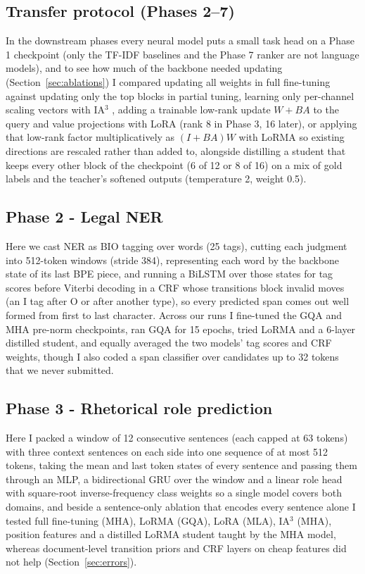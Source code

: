 \documentclass[11pt, oneside]{article}
\begin{document}
\subsection{Transfer protocol (Phases 2--7)}
In the downstream phases every neural model puts a small task head on a Phase 1 checkpoint (only the TF-IDF baselines and the Phase 7 ranker are not language models), and to see how much of the backbone needed updating (Section~\ref{sec:ablations}) I compared updating all weights in full fine-tuning against updating only the top blocks in partial tuning, learning only per-channel scaling vectors with IA$^3$ \cite{liu2022ia3}, adding a trainable low-rank update $W+BA$ to the query and value projections with LoRA \cite{hu2022lora} (rank 8 in Phase 3, 16 later), or applying that low-rank factor multiplicatively as $(I+BA)W$ with LoRMA \cite{bihany2025lorma} so existing directions are rescaled rather than added to, alongside distilling \cite{hinton2015distilling} a student that keeps every other block of the checkpoint (6 of 12 or 8 of 16) on a mix of gold labels and the teacher's softened outputs (temperature 2, weight 0.5).

\subsection{Phase 2 - Legal NER}
Here we cast NER as BIO tagging over words (25 tags), cutting each judgment into 512-token windows (stride 384), representing each word by the backbone state of its last BPE piece, and running a BiLSTM over those states for tag scores before Viterbi decoding in a CRF \cite{lafferty2001crf} whose transitions block invalid moves (an I tag after O or after another type), so every predicted span comes out well formed from first to last character. Across our runs I fine-tuned the GQA and MHA pre-norm checkpoints, ran GQA for 15 epochs, tried LoRMA and a 6-layer distilled student, and equally averaged the two models' tag scores and CRF weights, though I also coded a span classifier over candidates up to 32 tokens that we never submitted.

\subsection{Phase 3 - Rhetorical role prediction}
Here I packed a window of 12 consecutive sentences (each capped at 63 tokens) with three context sentences on each side into one sequence of at most 512 tokens, taking the mean and last token states of every sentence and passing them through an MLP, a bidirectional GRU over the window and a linear role head with square-root inverse-frequency class weights so a single model covers both domains, and beside a sentence-only ablation that encodes every sentence alone I tested full fine-tuning (MHA), LoRMA (GQA), LoRA (MLA), IA$^3$ (MHA), position features and a distilled LoRMA student taught by the MHA model, whereas document-level transition priors and CRF layers on cheap features did not help (Section~\ref{sec:errors}).
\end{document}
